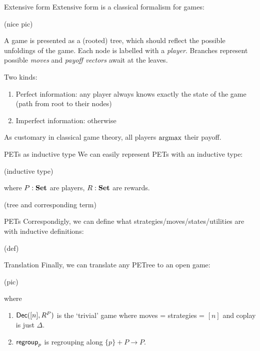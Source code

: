 \begin{framecard}
	{\color{colorbg}
	\bfseries

	}
\end{framecard}

\begin{frame}{Extensive form}
	Extensive form is a classical formalism for games:

	(nice pic)

	A game is presented as a (rooted) tree, which should reflect the possible unfoldings of the game.
	Each node is labelled with a \emph{player}. Branches represent possible \emph{moves} and \emph{payoff vectors} await at the leaves.

	Two kinds:
	\begin{enumerate}
		\item Perfect information: any player always knows exactly the state of the game (path from root to their nodes)
		\item Imperfect information: otherwise
	\end{enumerate}

	{\color{colornote}As customary in classical game theory, all players $\operatorname{argmax}$ their payoff.}
\end{frame}

\begin{frame}{PETs as inductive type}
	We can easily represent PETs with an inductive type:

	(inductive type)

	where $P : \mathbf{Set}$ are players, $R : \mathbf{Set}$ are rewards.

	(tree and corresponding term)
\end{frame}

\begin{frame}{PETs}
	Correspondigly, we can define what strategies/moves/states/utilities are with inductive definitions:

	(def)
\end{frame}

\begin{frame}{Translation}
	Finally, we can translate any PETree to an open game:

	(pic)

	where
	\begin{enumerate}
		\item $\mathsf{Dec}([n],R^P)$ is the `trivial' game where moves = strategies = $[n]$ and coplay is just $\Delta$.
		\item $\mathsf{regroup}_p$ is regrouping along $\{p\} + P \to P$.
	\end{enumerate}
\end{frame}

